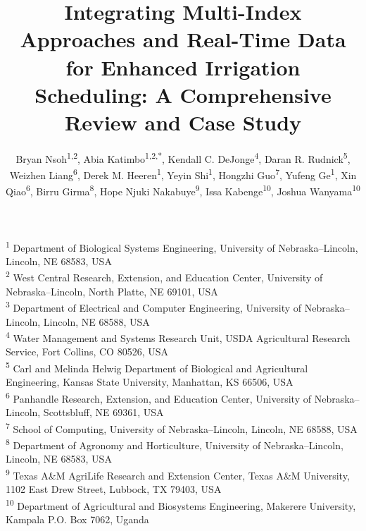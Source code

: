 \documentclass[12pt]{article}
\begin{document}
\title{Integrating Multi-Index Approaches and Real-Time Data for Enhanced Irrigation Scheduling: A Comprehensive Review and Case Study}
\author{%
  Bryan Nsoh\textsuperscript{1,2},
  Abia Katimbo\textsuperscript{1,2,*},
  Kendall C. DeJonge\textsuperscript{4},
  Daran R. Rudnick\textsuperscript{5},
  Weizhen Liang\textsuperscript{6},
  Derek M. Heeren\textsuperscript{1},
  Yeyin Shi\textsuperscript{1},
  Hongzhi Guo\textsuperscript{7},
  Yufeng Ge\textsuperscript{1},
  Xin Qiao\textsuperscript{6},
  Birru Girma\textsuperscript{8},
  Hope Njuki Nakabuye\textsuperscript{9},
  Issa Kabenge\textsuperscript{10},
  Joshua Wanyama\textsuperscript{10}
}

\date{\vspace{-1em}} %
\maketitle

\noindent
\textsuperscript{1} Department of Biological Systems Engineering, University of Nebraska–Lincoln, Lincoln, NE 68583, USA\\
\textsuperscript{2} West Central Research, Extension, and Education Center, University of Nebraska–Lincoln, North Platte, NE 69101, USA\\
\textsuperscript{3} Department of Electrical and Computer Engineering, University of Nebraska–Lincoln, Lincoln, NE 68588, USA\\
\textsuperscript{4} Water Management and Systems Research Unit, USDA Agricultural Research Service, Fort Collins, CO 80526, USA\\
\textsuperscript{5} Carl and Melinda Helwig Department of Biological and Agricultural Engineering, Kansas State University, Manhattan, KS 66506, USA\\
\textsuperscript{6} Panhandle Research, Extension, and Education Center, University of Nebraska–Lincoln, Scottsbluff, NE 69361, USA\\
\textsuperscript{7} School of Computing, University of Nebraska–Lincoln, Lincoln, NE 68588, USA\\
\textsuperscript{8} Department of Agronomy and Horticulture, University of Nebraska–Lincoln, Lincoln, NE 68583, USA\\
\textsuperscript{9} Texas A\&M AgriLife Research and Extension Center, Texas A\&M University, 1102 East Drew Street, Lubbock, TX 79403, USA\\
\textsuperscript{10} Department of Agricultural and Biosystems Engineering, Makerere University, Kampala P.O. Box 7062, Uganda
\end{document}
